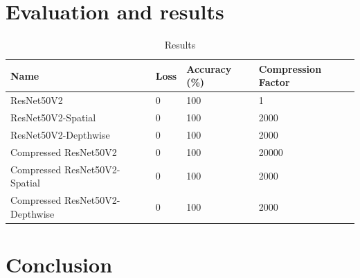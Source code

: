 \documentclass{article}
\begin{document}
	
	\section{Evaluation and results}
	
	
	
	\begin{table}[h!]
		\caption{Results}
		\label{tbl:results}
		\centering
		\begin{tabular}{llll}
			\toprule
			Name                            & Loss & Accuracy (\%) & Compression Factor \\ \midrule
			ResNet50V2                      & 0    & 100           & 1     \\
			ResNet50V2-Spatial              & 0    & 100           & 2000      \\
			ResNet50V2-Depthwise            & 0    & 100           & 2000      \\
			Compressed ResNet50V2           & 0    & 100           & 20000     \\
			Compressed ResNet50V2-Spatial   & 0    & 100           & 2000      \\
			Compressed ResNet50V2-Depthwise & 0    & 100           & 2000      \\ \bottomrule
		\end{tabular}
	\end{table}
	
	
	\section{Conclusion}
	
	
	
%	

	
\end{document}

